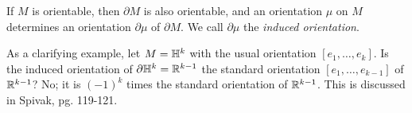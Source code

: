 \begin{simpleprop}
    If $M$ is orientable, then $\partial M$ is also orientable, and an orientation $\mu$ on $M$ determines an orientation $\partial \mu$ of $\partial M$. We call $\partial \mu$ the \textit{induced orientation}.
\end{simpleprop}
\noindent As a clarifying example, let $M = \mathbb H^k$ with the usual orientation $[e_1, \dots, e_k]$. Is the induced orientation of $\partial \mathbb H^k = \mathbb R^{k-1}$ the standard orientation $[e_1, \dots, e_{k-1}]$ of $\mathbb R^{k-1}$? No; it is $(-1)^k$ times the standard orientation of $\mathbb R^{k-1}$. This is discussed in Spivak, pg. 119-121.